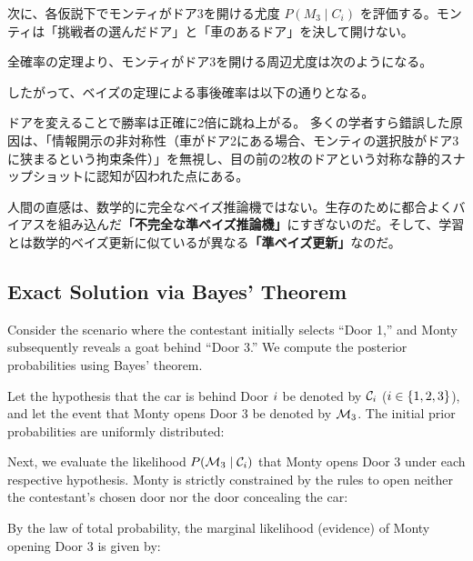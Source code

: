     


    次に、各仮説下でモンティがドア3を開ける尤度 $P(M_3 \mid C_i)$ を評価する。モンティは「挑戦者の選んだドア」と「車のあるドア」を決して開けない。

    

    全確率の定理より、モンティがドア3を開ける周辺尤度は次のようになる。

    

    したがって、ベイズの定理による事後確率は以下の通りとなる。

    

    ドアを変えることで勝率は正確に2倍に跳ね上がる。
    多くの学者すら錯誤した原因は、「情報開示の非対称性（車がドア2にある場合、モンティの選択肢がドア3に狭まるという拘束条件）」を無視し、目の前の2枚のドアという対称な静的スナップショットに認知が囚われた点にある。

    人間の直感は、数学的に完全なベイズ推論機ではない。生存のために都合よくバイアスを組み込んだ\textbf{「不完全な準ベイズ推論機」}にすぎないのだ。そして、学習とは数学的ベイズ更新に似ているが異なる\textbf{「準ベイズ更新」}なのだ。

\else
    \subsection{Exact Solution via Bayes' Theorem}
    Consider the scenario where the contestant initially selects ``Door 1,'' and Monty subsequently reveals a goat behind ``Door 3.'' We compute the posterior probabilities using Bayes' theorem.

    Let the hypothesis that the car is behind Door $i$ be denoted by $\mathcal{C}_{i}$ ($i \in \{1, 2, 3\}$), and let the event that Monty opens Door 3 be denoted by $\mathcal{M}_3$.
    The initial prior probabilities are uniformly distributed:

    

    Next, we evaluate the likelihood $P(\mathcal{M}_3 \mid \mathcal{C}_{i})$ that Monty opens Door 3 under each respective hypothesis. Monty is strictly constrained by the rules to open neither the contestant's chosen door nor the door concealing the car:

    

    By the law of total probability, the marginal likelihood (evidence) of Monty opening Door 3 is given by:

